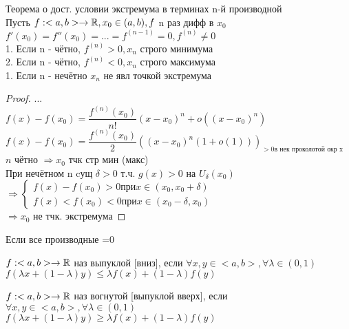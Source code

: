 \begin{theorem}
	Теорема о дост. условии экстремума в терминах n-й производной \\
	Пусть $ f : <a,b> \rightarrow \mathbb{R}, x_0 \in (a,b),\\
	f $ n раз дифф в $ x_0 $ \\
	$ f'(x_0) = f''(x_0) = ... = f^{(n-1)} = 0, f^{(n)} \neq 0 $ \\
	1. Если n - чётно, $ f^{(n)} > 0, x_n $  строго минимума \\
	2. Если n - чётно, $ f^{(n)} < 0, x_n $  строго максимума \\
	1. Если n - нечётно $ x_n $ не явл точкой экстремума \\
	\begin{proof}
		... \\
		$ f(x) - f(x_0) = \dfrac{f^{(n)} (x_0)}{n!} (x-x_0)^n + o((x-x_0)^n) $\\
		$ f(x) - f(x_0) = \dfrac{f^{(n)} (x_0)}{2} \left((x-x_0)^n (1 + o(1)) \right)_{>0 \text{в нек проколотой окр x}} $ \\
		$ n $ чётно $ \Rightarrow x_0 $ тчк стр мин (макс) \\
		При нечётном n cущ $ \delta > 0 $ т.ч. $ g(x) > 0 $ на $ U_{\delta} (x_0) $ \\
		$ \Rightarrow \left\{ \begin{array}{cc}
			f(x) - f(x_0) > 0 \text{при} x \in (x_0, x_0 + \delta) \\
			f(x) < f(x_0) < 0 \text{при} x \in (x_0 - \delta, x_0)
		\end{array} \right.  $ \\
		$ \Rightarrow x_0$ не тчк. экстремума  
	\end{proof}
\end{theorem}
Если все производные =0 \\
\begin{definition}
	$ f : <a,b> \rightarrow \mathbb{R} $ наз выпуклой [вниз], если $ \forall x,y \in <a,b> , \forall \lambda \in (0,1) $ \\
	$ f(\lambda x + (1- \lambda) y) \leq \lambda f(x) + (1 - \lambda) f(y) $ \\
\end{definition}
\begin{definition}
	$ f : <a,b> \rightarrow \mathbb{R} $ наз вогнутой [выпуклой вверх], если $ \forall x,y \in <a,b> , \forall \lambda \in (0,1) $ \\
	$ f(\lambda x + (1- \lambda) y) \geq \lambda f(x) + (1 - \lambda) f(y) $ \\
\end{definition}
